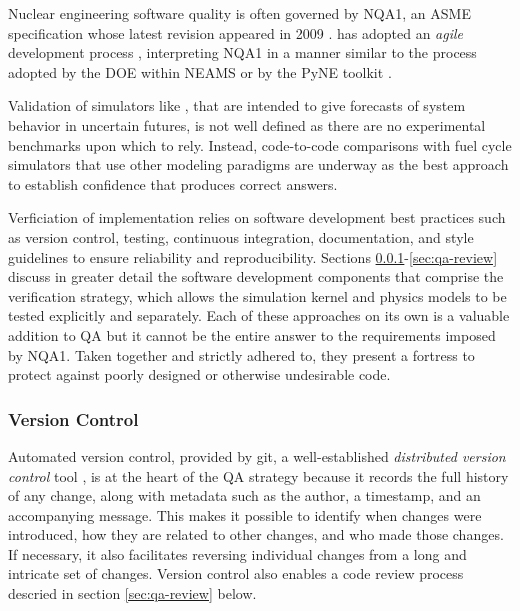 Nuclear engineering software quality is often governed by \gls{NQA1}, an
\gls{ASME} specification whose latest revision appeared in 2009
\cite{asme_nqa-1a-2009_2009}.  \Cyclus has adopted an \emph{agile} development
process \cite{larman_agile_2004}, interpreting \gls{NQA1} in a manner similar
to the process adopted by the \gls{DOE} within \gls{NEAMS}
\cite{neams_nuclear_2013} or by the PyNE toolkit \cite{biondo_quality_2014}.

Validation of simulators like \Cyclus, that are intended to give forecasts of
system behavior in uncertain futures, is not well defined as there are no
experimental benchmarks upon which to rely.  Instead, code-to-code comparisons
with fuel cycle simulators that use other modeling paradigms are underway as
the best approach to establish confidence that \Cyclus produces correct
answers. \cite{huff_extensions_2014}

Verficiation of \Cyclus implementation relies on software development best
practices such as version control, testing, continuous integration,
documentation, and style guidelines to ensure reliability and
reproducibility. Sections \ref{sec:qa-vc}-\ref{sec:qa-review} discuss in
greater detail the software development components that comprise the \Cyclus
verification strategy, which allows the simulation kernel and physics models
to be tested explicitly and separately. Each of these approaches on its own is
a valuable addition to \gls{QA} but it cannot be the entire answer to the
requirements imposed by \gls{NQA1}. Taken together and strictly adhered to,
they present a fortress to protect against poorly designed or otherwise
undesirable code.

\subsubsection{Version Control}
\label{sec:qa-vc}

Automated version control, provided by git, a well-established \emph{distributed
  version control} tool \cite{software_freedom_conservancy_git_2014}, is
at the heart of the QA strategy because it records the full history of any
change, along with metadata such as the author, a timestamp, and an
accompanying message. This makes it possible to identify when changes were
introduced, how they are related to other changes, and who made those changes.  If
necessary, it also facilitates reversing individual changes from a long and
intricate set of changes.  Version control also enables a code review process
descried in section \ref{sec:qa-review} below.

